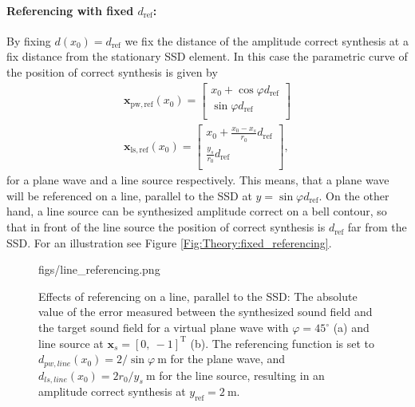 \documentclass[12pt,a4paper]{article}
\newcommand{\sinfi}{\sin\varphi}
\newcommand{\cosfi}{\cos\varphi}
\newcommand{\yref}{y_{\mathrm{ref}}}
\newcommand{\dref}{d_{\mathrm{ref}}}
\begin{document}
\paragraph{Referencing with fixed $\dref$:\\}
By fixing $d(x_0) = \dref$ we fix the distance of the amplitude correct synthesis at a fix distance from the stationary SSD element. In this case the parametric curve of the position of correct synthesis is given by
\begin{eqnarray}
\mathbf{x}_{\mathrm{pw, ref}}(x_0) =  \begin{bmatrix} x_0 + \cosfi \dref \\[0.3em] \sinfi \dref \\[0.3em]    \end{bmatrix} \\
\mathbf{x}_{\mathrm{ls, ref}}(x_0) =  \begin{bmatrix} x_0 + \frac{x_0-x_s}{r_0} \dref \\[0.3em] \frac{y_s}{r_0} \dref \\[0.3em]    \end{bmatrix},
\label{Eq:Fixed_referencing}
\end{eqnarray}
for a plane wave and a line source respectively. This means, that a plane wave will be referenced on a line, parallel to the SSD at $y = \sinfi \dref$. On the other hand, a line source can be synthesized amplitude correct on a bell contour, so that in front of the line source the position of correct synthesis is $\dref$ far from the SSD. For an illustration see Figure \ref{Fig:Theory:fixed_referencing}.

\begin{figure}
	\centering
	\begin{overpic}[width = 1\columnwidth ]{figs/line_referencing.png}
	\scriptsize
	\end{overpic}
\caption{Effects of referencing on a line, parallel to the SSD: The absolute value of the error measured between the synthesized sound field and the target sound field for a virtual plane wave with $\varphi = 45^{\circ}$ (a) and line source at $\mathbf{x}_s = [0,\ -1]^{\mathrm{T}}$ (b). The referencing function is set to $d_{pw,line}(x_0) = 2 / \sinfi ~\mathrm{m}$ for the plane wave, and $d_{ls,line}(x_0) = 2 r_0/y_s ~\mathrm{m}$ for the line source, resulting in an amplitude correct synthesis at $\yref = 2~\mathrm{m}$.}
	\label{Fig:Theory:line_referencing}
\end{figure}
\end{document}

